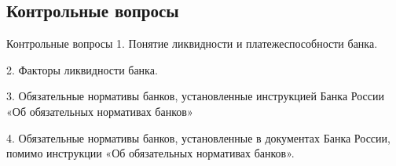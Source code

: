 \documentclass[_Banking_p2.tex]{subfiles}
\begin{document}
\subsection{Контрольные вопросы}
\begin{frame}{Контрольные вопросы}
1. Понятие ликвидности и платежеспособности банка.

2. Факторы ликвидности банка.

3. Обязательные нормативы банков, установленные инструкцией Банка России «Об обязательных нормативах банков»

4. Обязательные нормативы банков, установленные в документах Банка России, помимо инструкции «Об обязательных нормативах банков».
\end{frame}

\end{document}
